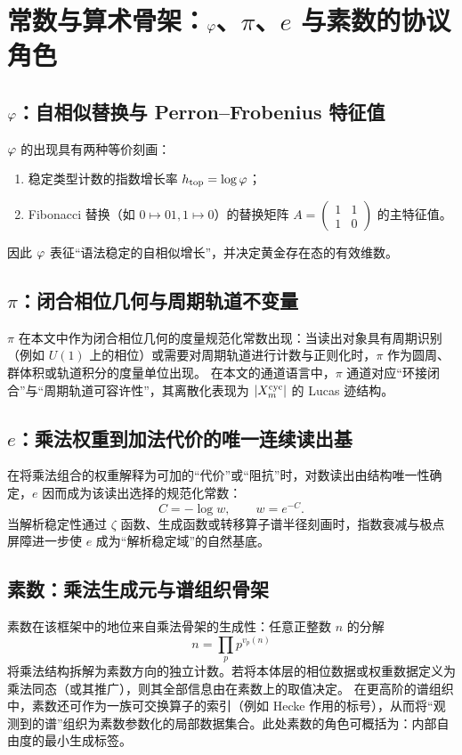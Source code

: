 \section{常数与算术骨架：\texorpdfstring{$\varphi$、$\pi$、$e$}{phi, pi, e} 与素数的协议角色}

\subsection{\texorpdfstring{$\varphi$}{phi}：自相似替换与 Perron--Frobenius 特征值}

$\varphi$ 的出现具有两种等价刻画：
\begin{enumerate}
  \item 稳定类型计数的指数增长率 $h_{\mathrm{top}}=\log\varphi$；
  \item Fibonacci 替换（如 $0\mapsto 01,1\mapsto 0$）的替换矩阵 $A=\begin{pmatrix}1&1\\1&0\end{pmatrix}$ 的主特征值。
\end{enumerate}
因此 $\varphi$ 表征“语法稳定的自相似增长”，并决定黄金存在态的有效维数。

\subsection{\texorpdfstring{$\pi$}{pi}：闭合相位几何与周期轨道不变量}

$\pi$ 在本文中作为闭合相位几何的度量规范化常数出现：当读出对象具有周期识别（例如 $U(1)$ 上的相位）或需要对周期轨道进行计数与正则化时，$\pi$ 作为圆周、群体积或轨道积分的度量单位出现。
在本文的通道语言中，$\pi$ 通道对应“环接闭合”与“周期轨道可容许性”，其离散化表现为 $\left\lvert X_m^{\mathrm{cyc}}\right\rvert$ 的 Lucas 迹结构。

\subsection{\texorpdfstring{$e$}{e}：乘法权重到加法代价的唯一连续读出基}

在将乘法组合的权重解释为可加的“代价”或“阻抗”时，对数读出由结构唯一性确定，$e$ 因而成为该读出选择的规范化常数：
\[
C=-\log w,\qquad w=e^{-C}.
\]
当解析稳定性通过 $\zeta$ 函数、生成函数或转移算子谱半径刻画时，指数衰减与极点屏障进一步使 $e$ 成为“解析稳定域”的自然基底。

\subsection{素数：乘法生成元与谱组织骨架}

素数在该框架中的地位来自乘法骨架的生成性：任意正整数 $n$ 的分解
\[
n=\prod_{p} p^{v_p(n)}
\]
将乘法结构拆解为素数方向的独立计数。若将本体层的相位数据或权重数据定义为乘法同态（或其推广），则其全部信息由在素数上的取值决定。
在更高阶的谱组织中，素数还可作为一族可交换算子的索引（例如 Hecke 作用的标号），从而将“观测到的谱”组织为素数参数化的局部数据集合。此处素数的角色可概括为：内部自由度的最小生成标签。

